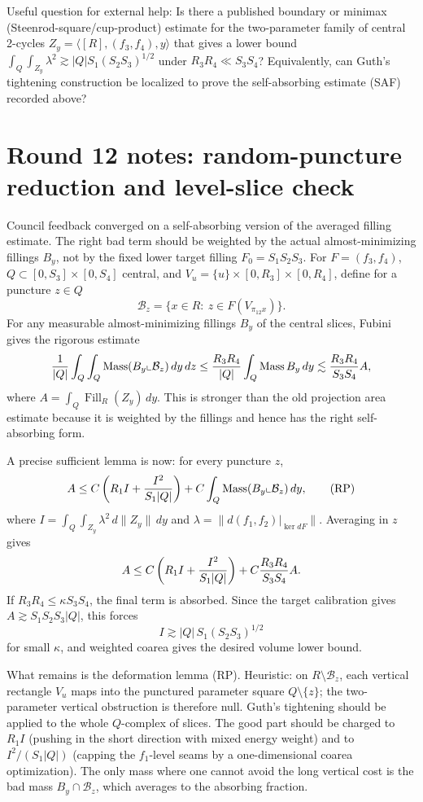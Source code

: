\documentclass[12pt]{article}
\newcommand{\Fill}{\operatorname{Fill}}
\newcommand{\Mass}{\operatorname{Mass}}
\begin{document}
Useful question for external help: Is there a published boundary or minimax
(Steenrod-square/cup-product) estimate for the two-parameter family of central
2-cycles \(Z_y=\langle[R],(f_3,f_4),y\rangle\) that gives a lower bound
\(\int_Q\int_{Z_y}\lambda^2\gtrsim |Q|S_1(S_2S_3)^{1/2}\) under
\(R_3R_4\ll S_3S_4\)?  Equivalently, can Guth's tightening construction be
localized to prove the self-absorbing estimate (SAF) recorded above?




\section*{Round 12 notes: random-puncture reduction and level-slice check}

Council feedback converged on a self-absorbing version of the averaged filling
estimate.  The right bad term should be weighted by the actual almost-minimizing
fillings \(B_y\), not by the fixed lower target filling \(F_0=S_1S_2S_3\).  For
\(F=(f_3,f_4)\), \(Q\subset [0,S_3]\times[0,S_4]\) central, and
\(V_u=\{u\}\times[0,R_3]\times[0,R_4]\), define for a puncture \(z\in Q\)
\[
 \mathcal B_z=\{x\in R:\ z\in F(V_{\pi_{12}x})\}.
\]
For any measurable almost-minimizing fillings \(B_y\) of the central slices,
Fubini gives the rigorous estimate
\[
 {1\over |Q|}\int_Q\int_Q \Mass(B_y\llcorner\mathcal B_z)\,dy\,dz
 \le {R_3R_4\over |Q|}\int_Q \Mass B_y\,dy
 \lesssim {R_3R_4\over S_3S_4}A,
\]
where \(A=\int_Q\Fill_R(Z_y)\,dy\).  This is stronger than the old projection
area estimate because it is weighted by the fillings and hence has the right
self-absorbing form.

A precise sufficient lemma is now:
for every puncture \(z\),
\[
 A\le C\left(R_1I+{I^2\over S_1|Q|}\right)
     +C\int_Q\Mass(B_y\llcorner\mathcal B_z)\,dy, \tag{RP}
\]
where \(I=\int_Q\int_{Z_y}\lambda^2\,d\|Z_y\|\,dy\) and
\(\lambda=\|d(f_1,f_2)|_{\ker dF}\|\).  Averaging in \(z\) gives
\[
 A\le C\left(R_1I+{I^2\over S_1|Q|}\right)
     +C{R_3R_4\over S_3S_4}A.
\]
If \(R_3R_4\le\kappa S_3S_4\), the final term is absorbed.  Since the target
calibration gives \(A\gtrsim S_1S_2S_3|Q|\), this forces
\[
I\gtrsim |Q|\,S_1(S_2S_3)^{1/2}
\]
for small \(\kappa\), and weighted coarea gives the desired volume lower bound.

What remains is the deformation lemma (RP).  Heuristic: on
\(R\setminus\mathcal B_z\), each vertical rectangle \(V_u\) maps into the
punctured parameter square \(Q\setminus\{z\}\); the two-parameter vertical
obstruction is therefore null.  Guth's tightening should be applied to the
whole \(Q\)-complex of slices.  The good part should be charged to \(R_1I\)
(pushing in the short direction with mixed energy weight) and to
\(I^2/(S_1|Q|)\) (capping the \(f_1\)-level seams by a one-dimensional coarea
optimization).  The only mass where one cannot avoid the long vertical cost is
the bad mass \(B_y\cap\mathcal B_z\), which averages to the absorbing fraction.
\end{document}
